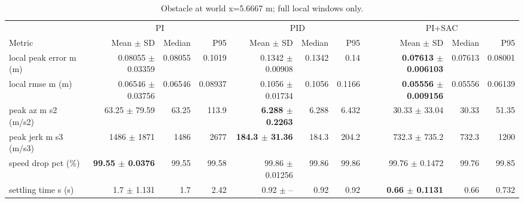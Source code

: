 \begin{table}[t]
\centering
\scriptsize
\caption{Obstacle at world x=5.6667 m; full local windows only.}
\label{tab:obstacle-9}
\begin{tabular}{p{}*{9}{r}}
\toprule
 & \multicolumn{3}{c}{PI} & \multicolumn{3}{c}{PID} & \multicolumn{3}{c}{PI+SAC} \\
\cmidrule(lr){2-4}\cmidrule(lr){5-7}\cmidrule(lr){8-10}
Metric & Mean $\pm$ SD & Median & P95 & Mean $\pm$ SD & Median & P95 & Mean $\pm$ SD & Median & P95 \\
\midrule
local peak error m (m) & 0.08055 $\pm$ 0.03359 & 0.08055 & 0.1019 & 0.1342 $\pm$ 0.00908 & 0.1342 & 0.14 & \textbf{0.07613 $\pm$ 0.006103} & 0.07613 & 0.08001 \\
local rmse m (m) & 0.06546 $\pm$ 0.03756 & 0.06546 & 0.08937 & 0.1056 $\pm$ 0.01734 & 0.1056 & 0.1166 & \textbf{0.05556 $\pm$ 0.009156} & 0.05556 & 0.06139 \\
peak az m s2 (m/s2) & 63.25 $\pm$ 79.59 & 63.25 & 113.9 & \textbf{6.288 $\pm$ 0.2263} & 6.288 & 6.432 & 30.33 $\pm$ 33.04 & 30.33 & 51.35 \\
peak jerk m s3 (m/s3) & 1486 $\pm$ 1871 & 1486 & 2677 & \textbf{184.3 $\pm$ 31.36} & 184.3 & 204.2 & 732.3 $\pm$ 735.2 & 732.3 & 1200 \\
speed drop pct (\%) & \textbf{99.55 $\pm$ 0.0376} & 99.55 & 99.58 & 99.86 $\pm$ 0.01256 & 99.86 & 99.86 & 99.76 $\pm$ 0.1472 & 99.76 & 99.85 \\
settling time s (s) & 1.7 $\pm$ 1.131 & 1.7 & 2.42 & 0.92 $\pm$ -- & 0.92 & 0.92 & \textbf{0.66 $\pm$ 0.1131} & 0.66 & 0.732 \\
\bottomrule
\end{tabular}
\end{table}
